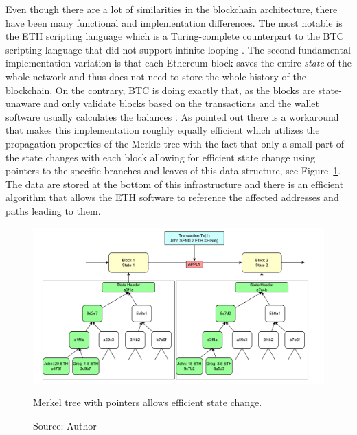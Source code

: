 Even though there are a lot of similarities in the blockchain architecture, 
there have been many functional and implementation differences. The most notable
is the \ac{ETH} scripting language which is a Turing-complete counterpart
to the \ac{BTC} scripting language that did not support infinite looping 
\cite[see Chapter Scripting]{buterin2013ethereum}. The second fundamental 
implementation variation is that each Ethereum block saves the entire 
\textit{state} of the whole network and thus does not need to store
the whole history of the blockchain. On the contrary, \ac{BTC} 
is doing exactly that, as the blocks are state-unaware and only validate blocks
based on the transactions and the wallet software usually
calculates the balances \cite[see Chapter 2]{Tikhomirov2018}. 
As \cite{buterin2013ethereum} pointed out there
is a workaround that makes this implementation roughly equally efficient 
which utilizes the propagation properties of the Merkle tree with the fact
that only a small part of the state changes with each block allowing for
efficient state change using pointers to the specific branches and leaves of 
this data structure, see Figure~\ref{fig:merkel}. The data are stored
at the bottom of this infrastructure and there is an efficient algorithm
that allows the \ac{ETH} software to reference the affected addresses and paths
leading to them.


\begin{center}
    \begin{figure}[H]
        \centering
            \includegraphics[width=1\textwidth]{Figures/merkle-tree.png}
        \caption{Merkel tree with pointers allows efficient state change.}
        \caption*{Source: Author}
        \label{fig:merkel}
    \end{figure}
\end{center}


